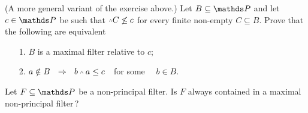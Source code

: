 \documentclass[creche.tex]{subfiles}
\begin{document}
\begin{exercise}
(A more general variant of the exercise above.) Let $B\subseteq \PP$ and let $c\in \PP$ be such that $\swedge C\not\le c$ for every finite non-empty $C\subseteq B$. Prove that the following are equivalent
\begin{itemize}
\item[1.] $B$ is a maximal filter relative to $c$;
\item[2.] $a\notin B\ \ \IMP\ \ b\swedge a \le c$\ \  for some \ \ $b\in B$.\QED
\end{itemize}
\end{exercise}


\begin{exercise}
Let $F\subseteq\PP$ be a non-principal filter. Is $F$ always contained in a maximal non-principal filter\,?\QED
\end{exercise}



\end{document}

